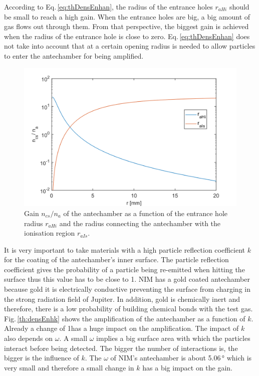 		According to Eq.\,\eqref{eq:thDensEnhan}, the radius of the entrance holes $r_{aHi}$ should be small to reach a high gain. When the entrance holes are big, a big amount of gas flows out through them. From that perspective, the biggest gain is achieved when the radius of the entrance hole is close to zero. Eq.\,\eqref{eq:thDensEnhan} does not take into account that at a certain opening radius is needed to allow particles to enter the antechamber for being amplified.\\
		\begin{figure}[h!] %
			\centering
			\includegraphics[width= .7\textwidth]{Bilder/raHi_raIs.png}
			\caption{Gain $n_{cs}/n_a$ of the antechamber as a function of the entrance hole radius $r_{aHi}$ and the radius connecting the antechamber with the ionisation region $r_{aIs}$.}
			\label{th:densEnhraHiraIs}
		\end{figure}
		It is very important to take materials with a high particle reflection coefficient $k$ for the coating of the antechamber's inner surface. The particle reflection coefficient gives the probability of a particle being re-emitted when hitting the surface thus this value has to be close to 1. NIM has a gold coated antechamber because gold it is electrically conductive preventing the surface from charging in the strong radiation field of Jupiter. In addition, gold is chemically inert and therefore, there is a low probability of building chemical bonds with the test gas. Fig.\,\ref{th:densEnhk} shows the amplification of the antechamber as a function of $k$. Already a change of 1\textperthousand  has a huge impact on the amplification. The impact of $k$ also depends on $\omega$. A small $\omega$ implies a big surface area with which the particles interact before being detected. The bigger the number of interactions is, the bigger is the influence of $k$. The $\omega$ of NIM's antechamber is about 5.06\,\si{\degree} which is very small and therefore a small change in $k$ has a big impact on the gain.\\
